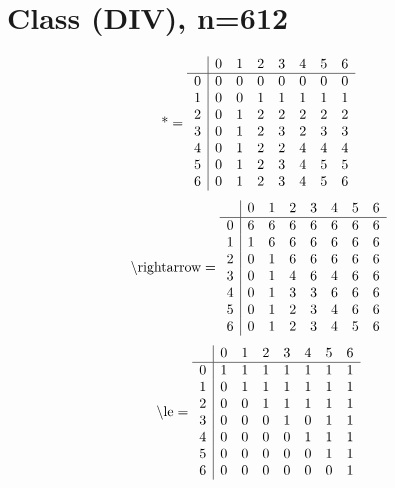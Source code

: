 \documentclass[11pt]{article}
\begin{document}
\section{Class (DIV), n=612}
\[\text{*} = 
\begin{array}{r | r r r r r r r}
 & 0 & 1 & 2 & 3 & 4 & 5 & 6 \\ \hline
0 & 0 & 0 & 0 & 0 & 0 & 0 & 0 \\
1 & 0 & 0 & 1 & 1 & 1 & 1 & 1 \\
2 & 0 & 1 & 2 & 2 & 2 & 2 & 2 \\
3 & 0 & 1 & 2 & 3 & 2 & 3 & 3 \\
4 & 0 & 1 & 2 & 2 & 4 & 4 & 4 \\
5 & 0 & 1 & 2 & 3 & 4 & 5 & 5 \\
6 & 0 & 1 & 2 & 3 & 4 & 5 & 6 \\
\end{array}
\]
\[\text{\textbackslash rightarrow} = 
\begin{array}{r | r r r r r r r}
 & 0 & 1 & 2 & 3 & 4 & 5 & 6 \\ \hline
0 & 6 & 6 & 6 & 6 & 6 & 6 & 6 \\
1 & 1 & 6 & 6 & 6 & 6 & 6 & 6 \\
2 & 0 & 1 & 6 & 6 & 6 & 6 & 6 \\
3 & 0 & 1 & 4 & 6 & 4 & 6 & 6 \\
4 & 0 & 1 & 3 & 3 & 6 & 6 & 6 \\
5 & 0 & 1 & 2 & 3 & 4 & 6 & 6 \\
6 & 0 & 1 & 2 & 3 & 4 & 5 & 6 \\
\end{array}
\]
\[\text{\textbackslash le} = 
\begin{array}{r | r r r r r r r}
 & 0 & 1 & 2 & 3 & 4 & 5 & 6 \\ \hline
0 & 1 & 1 & 1 & 1 & 1 & 1 & 1 \\
1 & 0 & 1 & 1 & 1 & 1 & 1 & 1 \\
2 & 0 & 0 & 1 & 1 & 1 & 1 & 1 \\
3 & 0 & 0 & 0 & 1 & 0 & 1 & 1 \\
4 & 0 & 0 & 0 & 0 & 1 & 1 & 1 \\
5 & 0 & 0 & 0 & 0 & 0 & 1 & 1 \\
6 & 0 & 0 & 0 & 0 & 0 & 0 & 1 \\
\end{array}
\]
\end{document}
